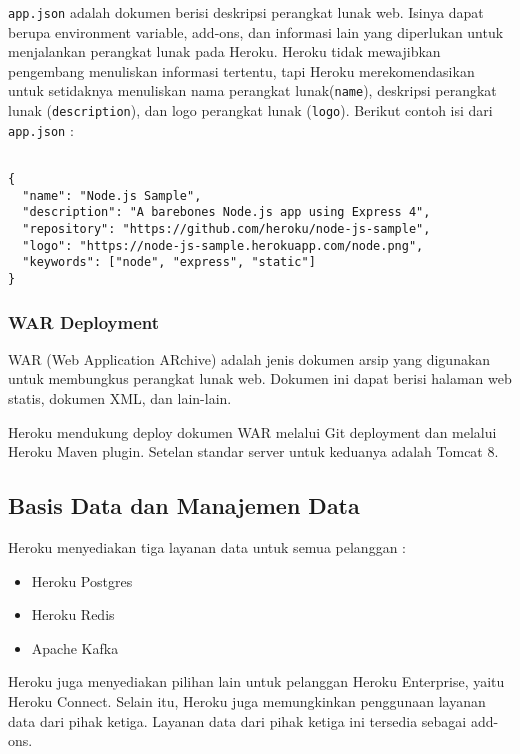 \texttt{app.json} adalah dokumen berisi deskripsi perangkat lunak web. Isinya dapat berupa environment variable, add-ons, dan informasi lain yang diperlukan untuk menjalankan perangkat lunak pada Heroku. Heroku tidak mewajibkan pengembang menuliskan informasi tertentu, tapi Heroku merekomendasikan untuk setidaknya menuliskan nama perangkat lunak(\texttt{name}), deskripsi perangkat lunak (\texttt{description}), dan logo perangkat lunak (\texttt{logo}). Berikut contoh isi dari \texttt{app.json} :
\begin{lstlisting}

{
  "name": "Node.js Sample",
  "description": "A barebones Node.js app using Express 4",
  "repository": "https://github.com/heroku/node-js-sample",
  "logo": "https://node-js-sample.herokuapp.com/node.png",
  "keywords": ["node", "express", "static"]
}

\end{lstlisting}

\subsubsection{WAR Deployment}
WAR (Web Application ARchive) adalah jenis dokumen arsip yang digunakan untuk membungkus perangkat lunak web. Dokumen ini dapat berisi halaman web statis, dokumen XML, dan lain-lain. \cite{etzkorn2017introduction}
 
Heroku mendukung deploy dokumen WAR melalui Git deployment dan melalui Heroku Maven plugin. Setelan standar server untuk keduanya adalah Tomcat 8.

\subsection{Basis Data dan Manajemen Data}
Heroku menyediakan tiga layanan data untuk semua pelanggan :
\begin{itemize}
\item Heroku Postgres
\item Heroku Redis
\item Apache Kafka
\end{itemize}
Heroku juga menyediakan pilihan lain untuk pelanggan Heroku Enterprise, yaitu Heroku Connect. Selain itu, Heroku juga memungkinkan penggunaan layanan data dari pihak ketiga. Layanan data dari pihak ketiga ini tersedia sebagai add-ons.

